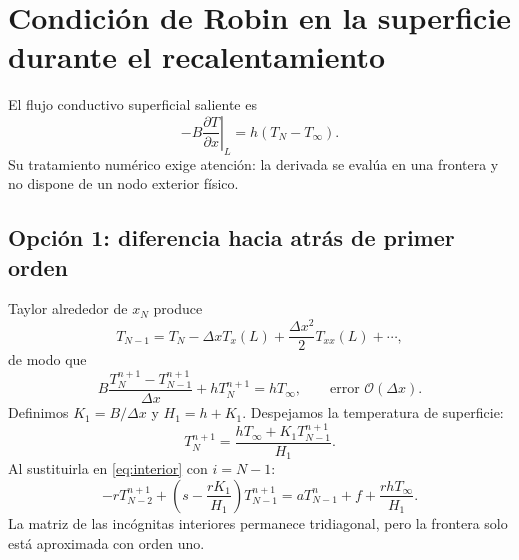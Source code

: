 \documentclass[11pt,a4paper]{article}
\newcommand{\OO}{\mathcal{O}}
\begin{document}
\section{Condición de Robin en la superficie durante el recalentamiento}
El flujo conductivo superficial saliente es
\begin{equation}-B\left.\frac{\partial T}{\partial x}\right|_{L}=h(T_N-T_\infty).\end{equation}
Su tratamiento numérico exige atención: la derivada se evalúa en una frontera y no dispone de un nodo exterior físico.

\subsection{Opción 1: diferencia hacia atrás de primer orden}
Taylor alrededor de $x_N$ produce
\begin{equation}
T_{N-1}=T_N-\Delta x T_x(L)+\frac{\Delta x^2}{2}T_{xx}(L)+\cdots,
\end{equation}
de modo que
\begin{equation}\label{eq:robin1}
 B\frac{T_N^{n+1}-T_{N-1}^{n+1}}{\Delta x}+hT_N^{n+1}=hT_\infty,\qquad \text{error }\OO(\Delta x).
\end{equation}
Definimos $K_1=B/\Delta x$ y $H_1=h+K_1$. Despejamos la temperatura de superficie:
\begin{equation}\boxed{T_N^{n+1}=\frac{hT_\infty+K_1T_{N-1}^{n+1}}{H_1}.}\label{eq:tn1}\end{equation}
Al sustituirla en \eqref{eq:interior} con $i=N-1$:
\begin{equation}\label{eq:last1}
-rT_{N-2}^{n+1}+
\left(s-\frac{rK_1}{H_1}\right)T_{N-1}^{n+1}
=aT_{N-1}^n+f+\frac{rhT_\infty}{H_1}.
\end{equation}
La matriz de las incógnitas interiores permanece tridiagonal, pero la frontera solo está aproximada con orden uno.
\end{document}
